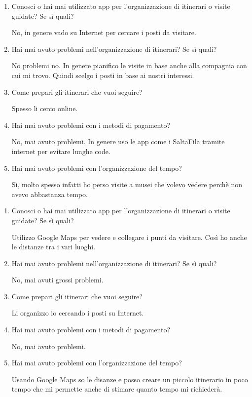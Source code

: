 
\begin{enumerate}

\item Conosci o hai mai utilizzato app per l'organizzazione di itinerari o visite guidate? Se sì quali?

No, in genere vado su Internet per cercare i posti da visitare.

\item Hai mai avuto problemi nell'organizzazione di itinerari? Se sì quali?

No problemi no. In genere pianifico le visite in base anche alla compagnia con cui mi trovo. Quindi scelgo i posti in base ai nostri interessi.

\item Come prepari gli itinerari che vuoi seguire?

Spesso li cerco online.

\item Hai mai avuto problemi con i metodi di pagamento?

No, mai avuto problemi. In genere uso le app come i SaltaFila tramite internet per evitare lunghe code.

\item Hai mai avuto problemi con l'organizzazione del tempo?

Sì, molto spesso infatti ho perso visite a musei che volevo vedere perchè non avevo abbastanza tempo.

\end{enumerate}


\begin{enumerate}

\item Conosci o hai mai utilizzato app per l'organizzazione di itinerari o visite guidate? Se sì quali?

Utilizzo Google Maps per vedere e collegare i punti da visitare. Così ho anche le distanze tra i vari luoghi.

\item Hai mai avuto problemi nell'organizzazione di itinerari? Se sì quali?

No, mai avuti grossi problemi.

\item Come prepari gli itinerari che vuoi seguire?

Li organizzo io cercando i posti su Internet.

\item Hai mai avuto problemi con i metodi di pagamento?

No, mai avuto problemi.

\item Hai mai avuto problemi con l'organizzazione del tempo?

Usando Google Maps so le disanze e posso creare un piccolo itinerario in poco tempo che mi permette anche di stimare quanto tempo mi richiederà.

\end{enumerate}


